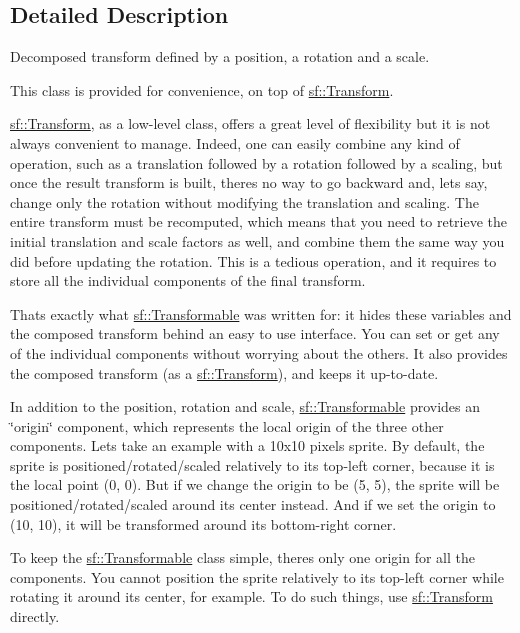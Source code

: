 \subsection{Detailed Description}
Decomposed transform defined by a position, a rotation and a scale. 

This class is provided for convenience, on top of \hyperlink{classsf_1_1_transform}{sf\+::\+Transform}.

\hyperlink{classsf_1_1_transform}{sf\+::\+Transform}, as a low-\/level class, offers a great level of flexibility but it is not always convenient to manage. Indeed, one can easily combine any kind of operation, such as a translation followed by a rotation followed by a scaling, but once the result transform is built, there\textquotesingle{}s no way to go backward and, let\textquotesingle{}s say, change only the rotation without modifying the translation and scaling. The entire transform must be recomputed, which means that you need to retrieve the initial translation and scale factors as well, and combine them the same way you did before updating the rotation. This is a tedious operation, and it requires to store all the individual components of the final transform.

That\textquotesingle{}s exactly what \hyperlink{classsf_1_1_transformable}{sf\+::\+Transformable} was written for\+: it hides these variables and the composed transform behind an easy to use interface. You can set or get any of the individual components without worrying about the others. It also provides the composed transform (as a \hyperlink{classsf_1_1_transform}{sf\+::\+Transform}), and keeps it up-\/to-\/date.

In addition to the position, rotation and scale, \hyperlink{classsf_1_1_transformable}{sf\+::\+Transformable} provides an \char`\"{}origin\char`\"{} component, which represents the local origin of the three other components. Let\textquotesingle{}s take an example with a 10x10 pixels sprite. By default, the sprite is positioned/rotated/scaled relatively to its top-\/left corner, because it is the local point (0, 0). But if we change the origin to be (5, 5), the sprite will be positioned/rotated/scaled around its center instead. And if we set the origin to (10, 10), it will be transformed around its bottom-\/right corner.

To keep the \hyperlink{classsf_1_1_transformable}{sf\+::\+Transformable} class simple, there\textquotesingle{}s only one origin for all the components. You cannot position the sprite relatively to its top-\/left corner while rotating it around its center, for example. To do such things, use \hyperlink{classsf_1_1_transform}{sf\+::\+Transform} directly.

